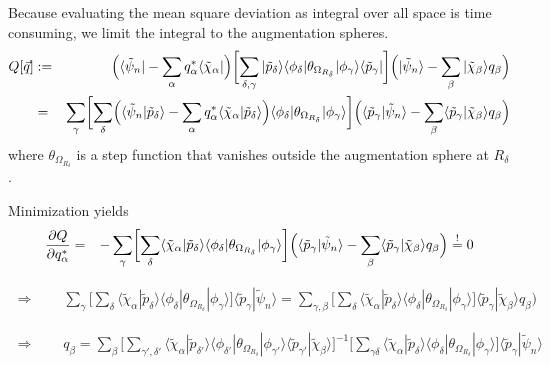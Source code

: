 \documentclass[11pt,a4paper]{report}
\begin{document}
Because evaluating the mean square deviation as integral over all
space is time consuming, we limit the integral to the augmentation
spheres.
\begin{eqnarray}
Q[\vec{q}]&:=&
\Bigl(\langle\tilde{\psi}_n|
-\sum_\alpha q^*_\alpha\langle\tilde{\chi}_\alpha|\Bigr)
\biggl[\sum_{\delta,\gamma}|\tilde{p}_\delta\rangle\langle\phi_\delta|
\theta_{\Omega_{R_\delta}}|\phi_\gamma\rangle\langle\tilde{p}_\gamma|\biggr]
\Bigl(|\tilde{\psi}_n\rangle
-\sum_\beta |\tilde{\chi}_\beta\rangle q_\beta\Bigr)
\nonumber\\
&=&
\sum_{\gamma}
\biggl[
\sum_{\delta}
\Bigl(\langle\tilde{\psi}_n|\tilde{p}_\delta\rangle
-\sum_\alpha q^*_\alpha\langle\tilde{\chi}_\alpha|\tilde{p}_\delta\rangle\Bigr)
\langle\phi_\delta|\theta_{\Omega_{R_\delta}}|\phi_\gamma\rangle
\biggr]
\Bigl(\langle\tilde{p}_\gamma|\tilde{\psi}_n\rangle
-\sum_\beta \langle\tilde{p}_\gamma|\tilde{\chi}_\beta\rangle q_\beta\Bigr)
\end{eqnarray}
where $\theta_{\Omega_{R_\delta}}$ is a step function that vanishes
outside the augmentation sphere at $R_\delta$.

Minimization yields
\begin{eqnarray}
\frac{\partial Q}{\partial q^*_\alpha}
&=&
-\sum_{\gamma}
\biggl[
\sum_{\delta}
\langle\tilde{\chi}_\alpha|\tilde{p}_\delta\rangle
\langle\phi_\delta|\theta_{\Omega_{R_\delta}}|\phi_\gamma\rangle
\biggr]
\Bigl(\langle\tilde{p}_\gamma|\tilde{\psi}_n\rangle
-\sum_\beta \langle\tilde{p}_\gamma|\tilde{\chi}_\beta\rangle q_\beta\Bigr)
\stackrel{!}{=}0
\nonumber
\end{eqnarray}


\begin{eqnarray}
\Rightarrow\qquad\sum_{\gamma}
\biggl[
\sum_{\delta}
\langle\tilde{\chi}_\alpha|\tilde{p}_\delta\rangle
\langle\phi_\delta|\theta_{\Omega_{R_\delta}}|\phi_\gamma\rangle
\biggr]
\langle\tilde{p}_\gamma|\tilde{\psi}_n\rangle
=
\sum_{\gamma,\beta}
\biggl[
\sum_{\delta}
\langle\tilde{\chi}_\alpha|\tilde{p}_\delta\rangle
\langle\phi_\delta|\theta_{\Omega_{R_\delta}}|\phi_\gamma\rangle
\biggr]
\langle\tilde{p}_\gamma|\tilde{\chi}_\beta\rangle q_\beta\Bigr)
\nonumber
\end{eqnarray}

\begin{eqnarray}
\Rightarrow\qquad
q_\beta=
\sum_{\beta}
\biggl[
\sum_{\gamma',\delta'}
\langle\tilde{\chi}_\alpha|\tilde{p}_{\delta'}\rangle
\langle\phi_{\delta'}|\theta_{\Omega_{R_\delta}}|\phi_{\gamma'}\rangle
\langle\tilde{p}_{\gamma'}|\tilde{\chi}_\beta\rangle 
\biggr]^{-1}
\biggl[
\sum_{\gamma\delta}
\langle\tilde{\chi}_\alpha|\tilde{p}_\delta\rangle
\langle\phi_\delta|\theta_{\Omega_{R_\delta}}|\phi_\gamma\rangle
\biggr]
\langle\tilde{p}_\gamma|\tilde{\psi}_n\rangle
\nonumber\\
\end{eqnarray}
\end{document}

